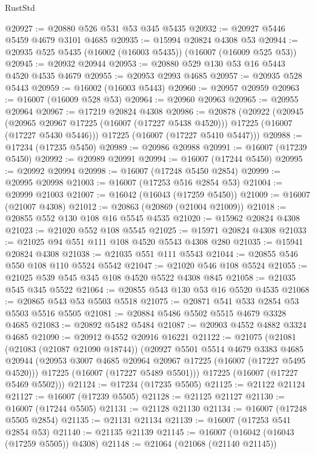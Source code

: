 \begin{lexlean}{RustStd}
\begin{coremodule}
@20927 := @20880 @526 @531 @53 @345 @5435
@20932 := @20927 @5446 @5459 @4679 @3101 @4685
@20935 := @15994 @20824 @4308 @53
@20944 := @20935 @525 @5435 (@16002 (@16003 @5435)) (@16007 (@16009 @525 @53))
@20945 := @20932 @20944
@20953 := @20880 @529 @130 @53 @16 @5443 @4520 @4535 @4679
@20955 := @20953 @2993 @4685
@20957 := @20935 @528 @5443
@20959 := @16002 (@16003 @5443)
@20960 := @20957 @20959
@20963 := @16007 (@16009 @528 @53)
@20964 := @20960 @20963
@20965 := @20955 @20964
@20967 := @17219 @20824 @4308
@20986 := @20878
    (@20922
      (@20945
        (@20965 @20967 @17225 (@16007 (@17227 @5438 @4520)))
        @17225
        (@16007 (@17227 @5430 @5446)))
      @17225
      (@16007 (@17227 @5410 @5447)))
@20988 := @17234 (@17235 @5450)
@20989 := @20986 @20988
@20991 := @16007 (@17239 @5450)
@20992 := @20989 @20991
@20994 := @16007 (@17244 @5450)
@20995 := @20992 @20994
@20998 := @16007 (@17248 @5450 @2854)
@20999 := @20995 @20998
@21003 := @16007 (@17253 @516 @2854 @53)
@21004 := @20999 @21003
@21007 := @16042 (@16043 (@17259 @5450))
@21009 := @16007 (@21007 @4308)
@21012 := @20863 (@20869 (@21004 @21009))
@21018 := @20855 @552 @130 @108 @16 @5545 @4535
@21020 := @15962 @20824 @4308
@21023 := @21020 @552 @108 @5545
@21025 := @15971 @20824 @4308
@21033 := @21025 @94 @551 @111 @108 @4520 @5543 @4308 @280
@21035 := @15941 @20824 @4308
@21038 := @21035 @551 @111 @5543
@21044 := @20855 @546 @550 @108 @110 @5524 @5542
@21047 := @21020 @546 @108 @5524
@21055 := @21025 @539 @545 @345 @108 @4520 @5522 @4308 @845
@21058 := @21035 @545 @345 @5522
@21064 := @20855 @543 @130 @53 @16 @5520 @4535
@21068 := @20865 @543 @53 @5503 @5518
@21075 := @20871 @541 @533 @2854 @53 @5503 @5516 @5505
@21081 := @20884 @5486 @5502 @5515 @4679 @3328 @4685
@21083 := @20892 @5482 @5484
@21087 := @20903 @4552 @4882 @3324 @4685
@21090 := @20912 @4552 @20916 @16221
@21122 := @21075
    (@21081
      (@21083 (@21087 @21090 @18744))
      (@20927
        @5501
        @5514
        @4679
        @3383
        @4685
        @20944
        (@20953 @3007 @4685 @20964 @20967 @17225 (@16007 (@17227 @5495 @4520)))
        @17225
        (@16007 (@17227 @5489 @5501)))
      @17225
      (@16007 (@17227 @5469 @5502)))
@21124 := @17234 (@17235 @5505)
@21125 := @21122 @21124
@21127 := @16007 (@17239 @5505)
@21128 := @21125 @21127
@21130 := @16007 (@17244 @5505)
@21131 := @21128 @21130
@21134 := @16007 (@17248 @5505 @2854)
@21135 := @21131 @21134
@21139 := @16007 (@17253 @541 @2854 @53)
@21140 := @21135 @21139
@21145 := @16007 (@16042 (@16043 (@17259 @5505)) @4308)
@21148 := @21064 (@21068 (@21140 @21145))

\end{coremodule}
\end{lexlean}
